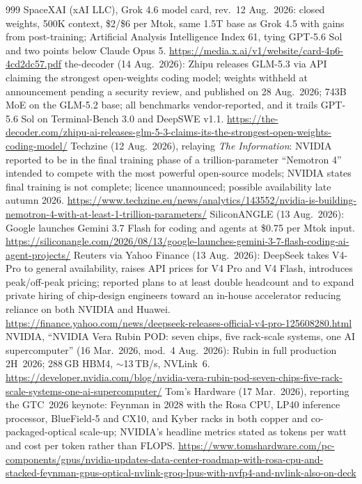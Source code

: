 \begin{thebibliography}{999}
 SpaceXAI (xAI LLC), Grok 4.6 model card, rev.\ 12 Aug.\ 2026: closed weights, 500K context, \$2/\$6 per Mtok, same 1.5T base as Grok 4.5 with gains from post-training; Artificial Analysis Intelligence Index 61, tying GPT-5.6 Sol and two points below Claude Opus 5. \url{https://media.x.ai/v1/website/card-4p6-4cd2dc57.pdf}
 the-decoder (14 Aug.\ 2026): Zhipu releases GLM-5.3 via API claiming the strongest open-weights coding model; weights withheld at announcement pending a security review, and published on 28 Aug.\ 2026; 743B MoE on the GLM-5.2 base; all benchmarks vendor-reported, and it trails GPT-5.6 Sol on Terminal-Bench 3.0 and DeepSWE v1.1. \url{https://the-decoder.com/zhipu-ai-releases-glm-5-3-claims-its-the-strongest-open-weights-coding-model/}
 Techzine (12 Aug.\ 2026), relaying \emph{The Information}: NVIDIA reported to be in the final training phase of a trillion-parameter ``Nemotron 4'' intended to compete with the most powerful open-source models; NVIDIA states final training is not complete; licence unannounced; possible availability late autumn 2026. \url{https://www.techzine.eu/news/analytics/143552/nvidia-is-building-nemotron-4-with-at-least-1-trillion-parameters/}
 SiliconANGLE (13 Aug.\ 2026): Google launches Gemini 3.7 Flash for coding and agents at \$0.75 per Mtok input. \url{https://siliconangle.com/2026/08/13/google-launches-gemini-3-7-flash-coding-ai-agent-projects/}
 Reuters via Yahoo Finance (13 Aug.\ 2026): DeepSeek takes V4-Pro to general availability, raises API prices for V4 Pro and V4 Flash, introduces peak/off-peak pricing; reported plans to at least double headcount and to expand private hiring of chip-design engineers toward an in-house accelerator reducing reliance on both NVIDIA and Huawei. \url{https://finance.yahoo.com/news/deepseek-releases-official-v4-pro-125608280.html}
 NVIDIA, ``NVIDIA Vera Rubin POD: seven chips, five rack-scale systems, one AI supercomputer'' (16 Mar.\ 2026, mod.\ 4 Aug.\ 2026): Rubin in full production 2H~2026; 288\,GB HBM4, $\sim$13\,TB/s, NVLink~6. \url{https://developer.nvidia.com/blog/nvidia-vera-rubin-pod-seven-chips-five-rack-scale-systems-one-ai-supercomputer/}
 Tom's Hardware (17 Mar.\ 2026), reporting the GTC~2026 keynote: Feynman in 2028 with the Rosa CPU, LP40 inference processor, BlueField-5 and CX10, and Kyber racks in both copper and co-packaged-optical scale-up; NVIDIA's headline metrics stated as tokens per watt and cost per token rather than FLOPS. \url{https://www.tomshardware.com/pc-components/gpus/nvidia-updates-data-center-roadmap-with-rosa-cpu-and-stacked-feynman-gpus-optical-nvlink-groq-lpus-with-nvfp4-and-nvlink-also-on-deck}

\end{thebibliography}
